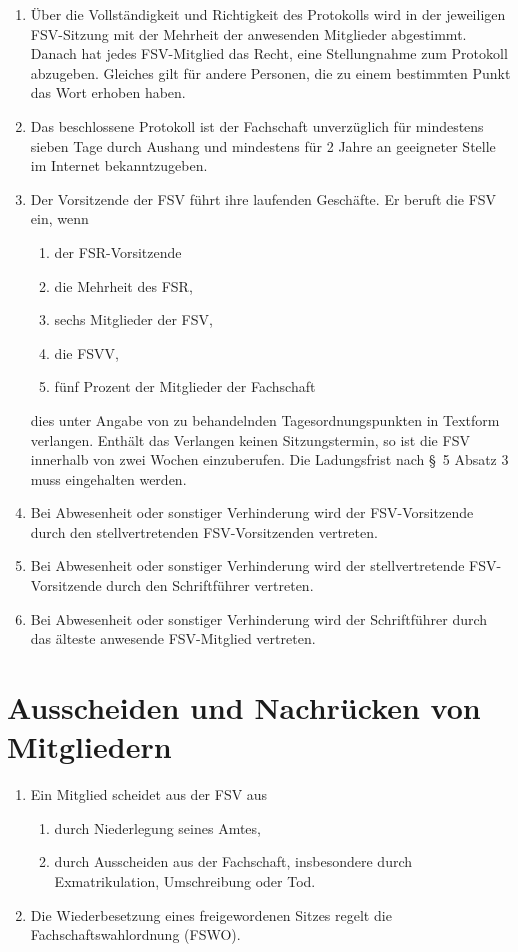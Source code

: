 \documentclass{article}
\begin{document}
\begin{enumerate}[(1)]
	\item Über die Vollständigkeit und Richtigkeit des Protokolls wird in der jeweiligen FSV-Sitzung mit der Mehrheit der anwesenden Mitglieder abgestimmt. Danach hat jedes FSV-Mitglied das Recht, eine Stellungnahme zum Protokoll abzugeben. Gleiches gilt für andere Personen, die zu einem bestimmten Punkt das Wort erhoben haben.
	\item Das beschlossene Protokoll ist der Fachschaft
    unverzüglich für mindestens sieben Tage durch Aushang und mindestens für 2 Jahre an geeigneter Stelle im Internet bekanntzugeben.
	\item Der Vorsitzende der FSV führt ihre laufenden Geschäfte. Er beruft die FSV ein, wenn
	\begin{enumerate}[1.]
	    \item der FSR-Vorsitzende
        \item die Mehrheit des FSR,
		\item sechs Mitglieder der FSV,
		\item die FSVV,
		\item fünf Prozent der Mitglieder der Fachschaft 
	\end{enumerate}
	dies unter Angabe von zu behandelnden Tagesordnungspunkten in Textform verlangen. Enthält das Verlangen keinen Sitzungstermin, so ist die FSV innerhalb von zwei Wochen einzuberufen. Die Ladungsfrist nach §~5 Absatz 3 muss eingehalten werden.
	\item Bei Abwesenheit oder sonstiger Verhinderung wird der FSV-Vorsitzende durch den stellvertretenden FSV-Vorsitzenden vertreten.
	\item Bei Abwesenheit oder sonstiger Verhinderung wird der stellvertretende FSV-Vorsitzende durch den Schriftführer vertreten.
	\item Bei Abwesenheit oder sonstiger Verhinderung wird der Schriftführer durch das älteste anwesende FSV-Mitglied vertreten.
\end{enumerate}

\section{Ausscheiden und Nachrücken von Mitgliedern}
\begin{enumerate}[(1)]
    \item Ein Mitglied scheidet aus der FSV aus
    	\begin{enumerate}[1.]
	    \item durch Niederlegung seines Amtes,
        \item durch Ausscheiden aus der Fachschaft, insbesondere durch Exmatrikulation, Umschreibung oder Tod.
	\end{enumerate}
	\item Die Wiederbesetzung eines freigewordenen Sitzes regelt die Fachschaftswahlordnung (FSWO). 
\end{enumerate}
\end{document}
